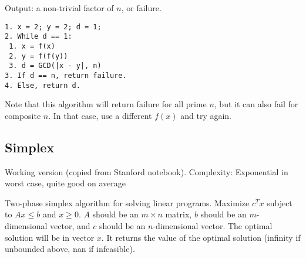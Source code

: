 \documentclass[letterpaper]{article}
\begin{document}
Output: a non-trivial factor of $n$, or failure.

\begin{lstlisting}
1. x = 2; y = 2; d = 1;
2. While d == 1:
 1. x = f(x)
 2. y = f(f(y))
 3. d = GCD(|x - y|, n)
3. If d == n, return failure.
4. Else, return d.
\end{lstlisting}

Note that this algorithm will return failure for all prime $n$, but it can also fail for composite $n$. In that case, use a different $f(x)$ and try again.

\subsection{Simplex}

Working version (copied from Stanford notebook). Complexity: Exponential in worst case, quite good on average

Two-phase simplex algorithm for solving linear programs. Maximize $c^T x$ subject to $Ax \leq b$ and $x \geq 0$. $A$ should be an $m\times n$ matrix, $b$ should be an $m$-dimensional vector, and $c$ should be an $n$-dimensional vector. The optimal solution will be in vector $x$. It returns the value of the optimal solution (infinity if unbounded above, nan if infeasible).
\end{document}

